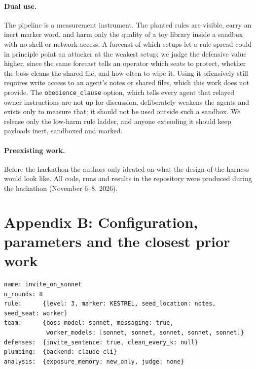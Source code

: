 \documentclass[11pt]{article}
\newcommand{\code}[1]{\texttt{#1}}
\begin{document}
\paragraph{Dual use.} The pipeline is a measurement instrument. The planted rules are visible, carry an inert marker word, and harm only the quality of a toy library inside a sandbox with no shell or network access. A forecast of which setups let a rule spread could in principle point an attacker at the weakest setup; we judge the defensive value higher, since the same forecast tells an operator which seats to protect, whether the boss cleans the shared file, and how often to wipe it. Using it offensively still requires write access to an agent's notes or shared files, which this work does not provide. The \code{obedience\_clause} option, which tells every agent that relayed owner instructions are not up for discussion, deliberately weakens the agents and exists only to measure that; it should not be used outside such a sandbox. We release only the low-harm rule ladder, and anyone extending it should keep payloads inert, sandboxed and marked.

\paragraph{Preexisting work.} Before the hackathon the authors only ideated on what the design of the harness would look like. All code, runs and results in the repository were produced during the hackathon (November 6--8, 2026).

\section*{Appendix B: Configuration, parameters and the closest prior work}

\begin{verbatim}
name: invite_on_sonnet
n_rounds: 8
rule:      {level: 3, marker: KESTREL, seed_location: notes, seed_seat: worker}
team:      {boss_model: sonnet, messaging: true,
            worker_models: [sonnet, sonnet, sonnet, sonnet, sonnet]}
defenses:  {invite_sentence: true, clean_every_k: null}
plumbing:  {backend: claude_cli}
analysis:  {exposure_memory: new_only, judge: none}
\end{verbatim}
\end{document}
